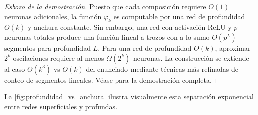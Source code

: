 \begin{enumerate}
\begin{proof}[Esbozo de la demostración]
		Puesto que cada composición requiere $O(1)$ neuronas adicionales, la función $\varphi_k$ es computable por una red de profundidad $O(k)$ y anchura constante. Sin embargo, una red con activación ReLU y $p$ neuronas totales produce una función lineal a trozos con a lo sumo $O(p^L)$ segmentos para profundidad $L$. Para una red de profundidad $O(k)$, aproximar $2^k$ oscilaciones requiere al menos $\Omega(2^k)$ neuronas. La construcción se extiende al caso $\Theta(k^3)$ vs $O(k)$ del enunciado mediante técnicas más refinadas de conteo de segmentos lineales. Véase \citet{telgarsky2016benefitsdepthneuralnetworks} para la demostración completa.
	\end{proof}

	La \autoref{fig:profundidad_vs_anchura} ilustra visualmente esta separación exponencial entre redes superficiales y profundas.

	\begin{figure}[h]
	\centering
\end{figure}
\end{enumerate}
